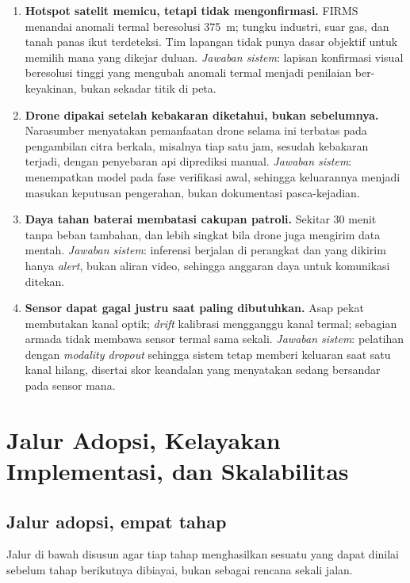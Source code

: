 \begin{enumerate}
\item \textbf{Hotspot satelit memicu, tetapi tidak mengonfirmasi.} FIRMS
menandai anomali termal beresolusi 375~m; tungku industri, suar gas, dan tanah
panas ikut terdeteksi. Tim lapangan tidak punya dasar objektif untuk memilih
mana yang dikejar duluan. \emph{Jawaban sistem}: lapisan konfirmasi visual
beresolusi tinggi yang mengubah anomali termal menjadi penilaian ber-keyakinan,
bukan sekadar titik di peta.

\item \textbf{Drone dipakai setelah kebakaran diketahui, bukan sebelumnya.}
Narasumber menyatakan pemanfaatan drone selama ini terbatas pada pengambilan
citra berkala, misalnya tiap satu jam, sesudah kebakaran terjadi, dengan
penyebaran api diprediksi manual. \emph{Jawaban sistem}: menempatkan model pada
fase verifikasi awal, sehingga keluarannya menjadi masukan keputusan pengerahan,
bukan dokumentasi pasca-kejadian.

\item \textbf{Daya tahan baterai membatasi cakupan patroli.} Sekitar 30 menit
tanpa beban tambahan, dan lebih singkat bila drone juga mengirim data mentah.
\emph{Jawaban sistem}: inferensi berjalan di perangkat dan yang dikirim hanya
\emph{alert}, bukan aliran video, sehingga anggaran daya untuk komunikasi
ditekan.

\item \textbf{Sensor dapat gagal justru saat paling dibutuhkan.} Asap pekat
membutakan kanal optik; \emph{drift} kalibrasi mengganggu kanal termal; sebagian
armada tidak membawa sensor termal sama sekali. \emph{Jawaban sistem}: pelatihan
dengan \emph{modality dropout} sehingga sistem tetap memberi keluaran saat satu
kanal hilang, disertai skor keandalan yang menyatakan sedang bersandar pada
sensor mana.
\end{enumerate}

\section{Jalur Adopsi, Kelayakan Implementasi, dan Skalabilitas}
\label{app:adopsi}

\subsection*{Jalur adopsi, empat tahap}

Jalur di bawah disusun agar tiap tahap menghasilkan sesuatu yang dapat dinilai
sebelum tahap berikutnya dibiayai, bukan sebagai rencana sekali jalan.

